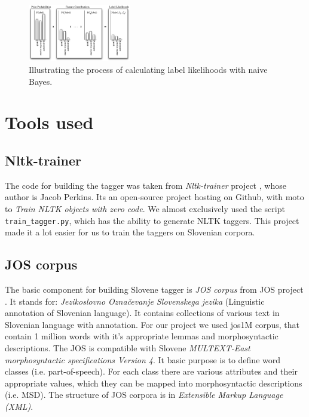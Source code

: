 \documentclass[10pt, conference, compsocconf]{IEEEtran}
\begin{document}
\begin{figure}[htb]
\begin{center}
\includegraphics[width=0.4\textwidth]{naive_bayes_bargraph.png} 
\end{center}
\caption{Illustrating the process of calculating label likelihoods with naive Bayes.}
\label{fig:naive-bayes-bargraph}
\end{figure}

\section{Tools used}
\label{toolsUsed}
\subsection{Nltk-trainer} %
The code for building the tagger was taken from \textit{Nltk-trainer}  project \cite{nltk-trainer}, whose author is Jacob Perkins.
Its an open-source project hosting on Github, with moto to \textit{Train NLTK objects with zero code}.
We almost exclusively used the script \texttt{train\_tagger.py}, which has the ability to generate NLTK taggers. This project made it a lot easier for us to train the taggers on Slovenian corpora.

\subsection{JOS corpus} %
The basic component for building Slovene tagger is \textit{JOS corpus} from JOS project \cite{JOS}. It stands for: \textit{Jezikoslovno Označevanje Slovenskega jezika} (Linguistic annotation of Slovenian language).
It contains collections of various text in Slovenian language with annotation.
For our project we used jos1M corpus, that contain 1 million words with it's appropriate lemmas and morphosyntactic descriptions.
The JOS is compatible with Slovene\textit{ MULTEXT-East morphosyntactic specifications Version 4}\cite{MULTEXT-East}.
It basic purpose is to define word classes (i.e. part-of-speech).
For each class there are various attributes and their appropriate values, which they can be mapped into morphosyntactic descriptions (i.e. MSD).
The structure of JOS corpora is in  \textit{Extensible Markup Language (XML)}.
\end{document}
